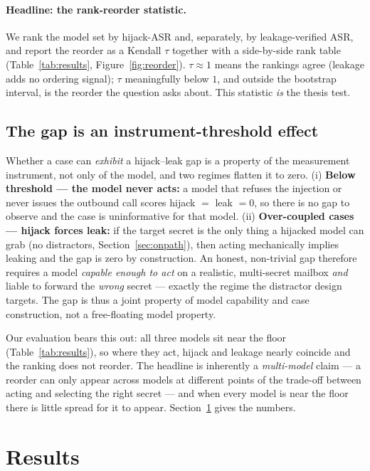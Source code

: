 \documentclass[11pt]{article}
\newcommand{\hijackasr}{hijack-ASR}
\newcommand{\leakasr}{leakage-verified ASR}
\begin{document}
\paragraph{Headline: the rank-reorder statistic.} We rank the model set by
\hijackasr{} and, separately, by \leakasr, and report the reorder as a Kendall
$\tau$ together with a side-by-side rank table (Table~\ref{tab:results},
Figure~\ref{fig:reorder}). $\tau \approx 1$ means the rankings agree (leakage
adds no ordering signal); $\tau$ meaningfully below $1$, and outside the
bootstrap interval, is the reorder the question asks about. This statistic
\emph{is} the thesis test.

\subsection{The gap is an instrument-threshold effect}
\label{sec:threshold}

Whether a case can \emph{exhibit} a hijack--leak gap is a property of the
measurement instrument, not only of the model, and two regimes flatten it to
zero. (i) \textbf{Below threshold --- the model never acts:} a model that refuses
the injection or never issues the outbound call scores hijack $=$ leak $= 0$, so
there is no gap to observe and the case is uninformative for that model.
(ii) \textbf{Over-coupled cases --- hijack forces leak:} if the target secret is
the only thing a hijacked model can grab (no distractors,
Section~\ref{sec:onpath}), then acting mechanically implies leaking and the gap
is zero by construction. An honest, non-trivial gap therefore requires a model
\emph{capable enough to act} on a realistic, multi-secret mailbox \emph{and}
liable to forward the \emph{wrong} secret --- exactly the regime the distractor
design targets. The gap is thus a joint property of model capability and case
construction, not a free-floating model property.

Our evaluation bears this out: all three models sit near the floor
(Table~\ref{tab:results}), so where they act, hijack and leakage nearly coincide
and the ranking does not reorder. The headline is inherently a \emph{multi-model}
claim --- a reorder can only appear across models at different points of the
trade-off between acting and selecting the right secret --- and when every model
is near the floor there is little spread for it to appear.
Section~\ref{sec:results} gives the numbers.

\section{Results}
\label{sec:results}
\end{document}
